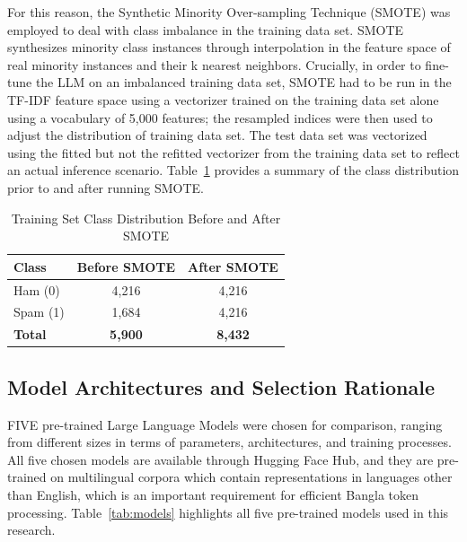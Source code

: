 \documentclass[journal]{IEEEtran}
\begin{document}
For this reason, the Synthetic Minority Over-sampling Technique (SMOTE)
was employed to deal with class imbalance in the training data set.
SMOTE synthesizes minority class instances through interpolation in the
feature space of real minority instances and their k nearest neighbors.
Crucially, in order to fine-tune the LLM on an imbalanced training data
set, SMOTE had to be run in the TF-IDF feature space using a vectorizer
trained on the training data set alone using a vocabulary of 5,000
features; the resampled indices were then used to adjust the
distribution of training data set. The test data set was vectorized
using the fitted but not the refitted vectorizer from the training data
set to reflect an actual inference scenario. Table~\ref{tab:smote} provides a summary
of the class distribution prior to and after running SMOTE.

\begin{table}[htbp]
\caption{Training Set Class Distribution Before and After SMOTE}
\label{tab:smote}
\begin{center}
\begin{tabular}{lcc}
\toprule
\textbf{Class} & \textbf{Before SMOTE} & \textbf{After SMOTE} \\
\midrule
Ham (0) & 4,216 & 4,216 \\
Spam (1) & 1,684 & 4,216 \\
\textbf{Total} & \textbf{5,900} & \textbf{8,432} \\
\bottomrule
\end{tabular}
\end{center}
\end{table}

\subsection{Model Architectures and Selection Rationale}

FIVE pre-trained Large Language Models were chosen for comparison,
ranging from different sizes in terms of parameters, architectures, and
training processes. All five chosen models are available through Hugging
Face Hub, and they are pre-trained on multilingual corpora which contain
representations in languages other than English, which is an important
requirement for efficient Bangla token processing. Table~\ref{tab:models}
highlights all five pre-trained models used in this research.
\end{document}
